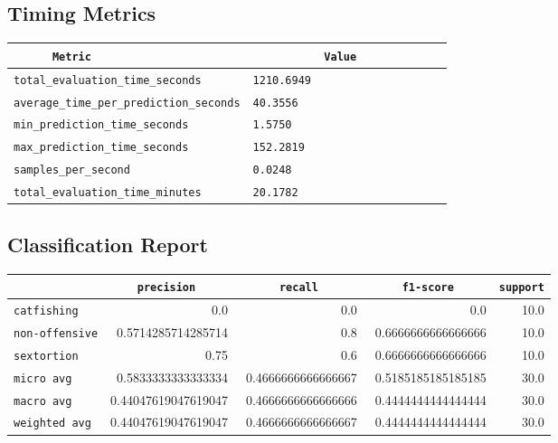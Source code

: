 \documentclass{article}
\begin{document}
\subsection{Timing Metrics}

\begin{center}
\begin{tabular}{l | l} \hline
    \verb|      Metric     | & \verb|           Value           | \\ \hline
    \hline
    \verb|total_evaluation_time_seconds| & \verb|1210.6949                    | \\ \hline
    \verb|average_time_per_prediction_seconds| & \verb|40.3556                      | \\ \hline
    \verb|min_prediction_time_seconds| & \verb|1.5750                       | \\ \hline
    \verb|max_prediction_time_seconds| & \verb|152.2819                     | \\ \hline
    \verb|samples_per_second| & \verb|0.0248                       | \\ \hline
    \verb|total_evaluation_time_minutes| & \verb|20.1782                      | \\ \hline
\end{tabular}
\end{center}

\subsection{Classification Report}

\begin{center}
\begin{tabular}{l | r | r | r | r} \hline
    \verb|            | & \verb|    precision     | & \verb|      recall      | & \verb|     f1-score     | & \verb|support| \\ \hline
    \hline
    \verb|catfishing | & 0.0 & 0.0 & 0.0 &    10.0 \\ \hline
    \verb|non-offensive| & 0.5714285714285714 & 0.8 & 0.6666666666666666 &    10.0 \\ \hline
    \verb|sextortion | & 0.75 & 0.6 & 0.6666666666666666 &    10.0 \\ \hline
    \verb|micro avg  | & 0.5833333333333334 & 0.4666666666666667 & 0.5185185185185185 &    30.0 \\ \hline
    \verb|macro avg  | & 0.44047619047619047 & 0.4666666666666666 & 0.4444444444444444 &    30.0 \\ \hline
    \verb|weighted avg| & 0.44047619047619047 & 0.4666666666666667 & 0.4444444444444444 &    30.0 \\ \hline
\end{tabular}
\end{center}
\end{document}

